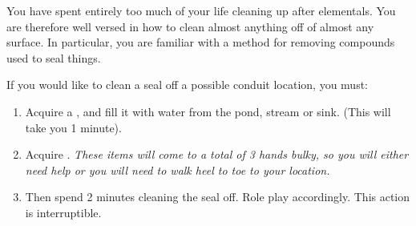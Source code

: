 \documentclass[green]{elementals}
\begin{document}
\name{\gUnsealConduit{}} 

You have spent entirely too much of your life cleaning up after elementals. You are therefore well versed in how to clean almost anything off of almost any surface. In particular, you are familiar with a method for removing compounds used to seal things. 

If you would like to clean a seal off a possible conduit location, you must: 
\begin{enumerate}
\item Acquire a \iBowl{}, and fill it with water from the pond, stream or sink. (This will take you 1 minute).
\item Acquire \iLye{}. \emph{These items will come to a total of 3 hands bulky, so you will either need help or you will need to  walk heel to toe to your location.} 
\item Then spend 2 minutes cleaning the seal off. Role play accordingly. This action is interruptible.
\end{enumerate}
\end{document}
